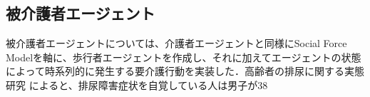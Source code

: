 \subsection{被介護者エージェント}

被介護者エージェントについては、介護者エージェントと同様にSocial Force Modelを軸に、歩行者エージェントを作成し、それに加えてエージェントの状態によって時系列的に発生する要介護行動を実装した．高齢者の排尿に関する実態研究 \cite{micturition} によると、排尿障害症状を自覚している人は男子が38%
